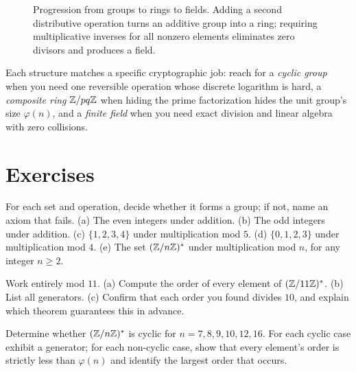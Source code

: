 \begin{figure}[htbp]
\caption{Progression from groups to rings to fields. Adding a second distributive operation turns an additive group into a ring; requiring multiplicative inverses for all nonzero elements eliminates zero divisors and produces a field.}
\label{fig:ch05-hierarchy}
\end{figure}

\begin{intuitionbox}
Each structure matches a specific cryptographic job: reach for a \emph{cyclic group} when you need one reversible operation whose discrete logarithm is hard, a \emph{composite ring} $\mathbb{Z}/pq\mathbb{Z}$ when hiding the prime factorization hides the unit group's size $\varphi(n)$, and a \emph{finite field} when you need exact division and linear algebra with zero collisions.
\end{intuitionbox}

\section{Exercises}
\label{ch05:exercises}

\begin{exercise}
\label{ch05:ex-group-or-not}
For each set and operation, decide whether it forms a group; if not, name an axiom that fails.
(a) The even integers under addition.
(b) The odd integers under addition.
(c) $\{1,2,3,4\}$ under multiplication mod $5$.
(d) $\{0,1,2,3\}$ under multiplication mod $4$.
(e) The set $(\mathbb{Z}/n\mathbb{Z})^{*}$ under multiplication mod $n$, for any integer $n \ge 2$.
\end{exercise}

\begin{exercise}
\label{ch05:ex-orders-hand}
Work entirely mod $11$. (a) Compute the order of every element of $(\mathbb{Z}/11\mathbb{Z})^{*}$. (b) List all
generators. (c) Confirm that each order you found divides $10$, and explain which theorem
guarantees this in advance.
\end{exercise}

\begin{exercise}
\label{ch05:ex-cyclic-or-not}
Determine whether $(\mathbb{Z}/n\mathbb{Z})^{*}$ is cyclic for $n = 7, 8, 9, 10, 12, 16$. For each cyclic case
exhibit a generator; for each non-cyclic case, show that every element's order is strictly
less than $\varphi(n)$ and identify the largest order that occurs.
\end{exercise}

